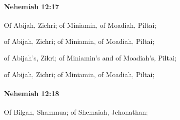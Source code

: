		\paragraph{Nehemiah 12:17} %
			\label{NEHEMIAH-12-17}

			Of Abijah, Zichri; of Miniamin, of Moadiah, Piltai;

			\begin{versebox}
					\item[BHS] 
					\item[ASV] of Abijah, Zichri; of Miniamin, of Moadiah, Piltai;
					\item[NIV] of Abijah’s, Zikri; of Miniamin’s and of Moadiah’s, Piltai;
					\item[NRSV] of Abijah, Zichri; of Miniamin, of Moadiah, Piltai;
			\end{versebox}

		\paragraph{Nehemiah 12:18} %
			\label{NEHEMIAH-12-18}

			Of Bilgah, Shammua; of Shemaiah, Jehonathan;

